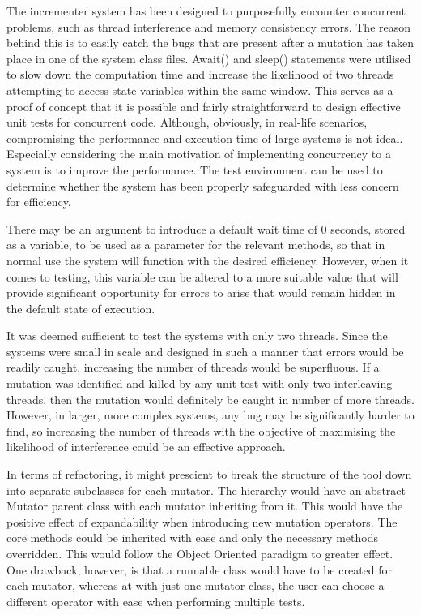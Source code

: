 \documentclass[a4paper,12pt]{article}
\begin{document}
The incrementer system has been designed to purposefully encounter concurrent problems, such as thread interference and memory consistency errors. The reason behind this is to easily catch the bugs that are present after a mutation has taken place in one of the system class files. Await() and sleep() statements were utilised to slow down the computation time and increase the likelihood of two threads attempting to access state variables within the same window. This serves as a proof of concept that it is possible and fairly straightforward to design effective unit tests for concurrent code. Although, obviously, in real-life scenarios, compromising the performance and execution time of large systems is not ideal. Especially considering the main motivation of implementing concurrency to a system is to improve the performance. The test environment can be used to determine whether the system has been properly safeguarded with less concern for efficiency.

There may be an argument to introduce a default wait time of 0 seconds, stored as a variable, to be used as a parameter for the relevant methods, so that in normal use the system will function with the desired efficiency. However, when it comes to testing, this variable can be altered to a more suitable value that will provide significant opportunity for errors to arise that would remain hidden in the default state of execution. 

It was deemed sufficient to test the systems with only two threads. Since the systems were small in scale and designed in such a manner that errors would be readily caught, increasing the number of threads would be superfluous. If a mutation was identified and killed by any unit test with only two interleaving threads, then the mutation would definitely be caught in number of more threads. However, in larger, more complex systems, any bug may be significantly harder to find, so increasing the number of threads with the objective of maximising the likelihood of interference could be an effective approach.

In terms of refactoring, it might prescient to break the structure of the tool down into separate subclasses for each mutator. The hierarchy would have an abstract Mutator parent class with each mutator inheriting from it. This would have the positive effect of expandability when introducing new mutation operators. The core methods could be inherited with ease and only the necessary methods overridden. This would follow the Object Oriented paradigm to greater effect. One drawback, however, is that a runnable class would have to be created for each mutator, whereas at with just one mutator class, the user can choose a different operator with ease when performing multiple tests.
\end{document}

